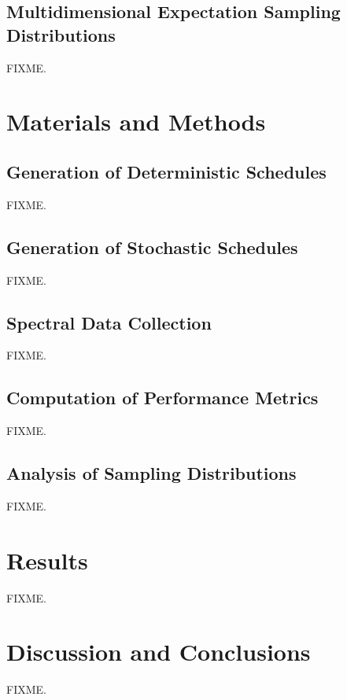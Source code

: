 \subsection{Multidimensional Expectation Sampling Distributions}

\begin{doublespace}
FIXME.
\end{doublespace}

\section{Materials and Methods}

\subsection{Generation of Deterministic Schedules}

\begin{doublespace}
FIXME.
\end{doublespace}

\subsection{Generation of Stochastic Schedules}

\begin{doublespace}
FIXME.
\end{doublespace}

\subsection{Spectral Data Collection}

\begin{doublespace}
FIXME.
\end{doublespace}

\subsection{Computation of Performance Metrics}

\begin{doublespace}
FIXME.
\end{doublespace}

\subsection{Analysis of Sampling Distributions}

\begin{doublespace}
FIXME.
\end{doublespace}

\section{Results}

\begin{doublespace}
FIXME.
\end{doublespace}

\section{Discussion and Conclusions}

\begin{doublespace}
FIXME.
\end{doublespace}




